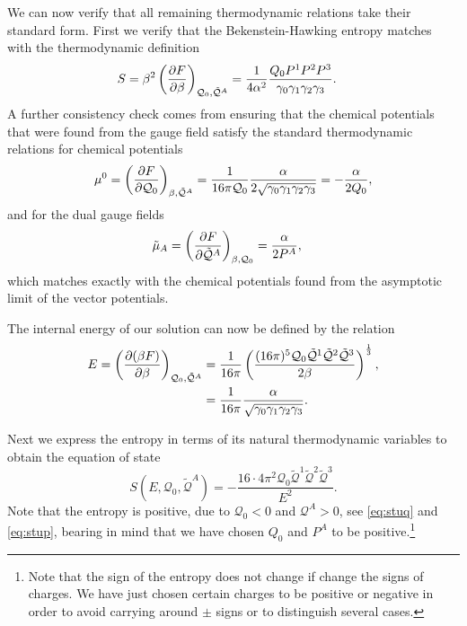 We can now verify that all remaining thermodynamic relations take their standard form.  First we verify that the Bekenstein-Hawking entropy matches with the thermodynamic definition
\begin{equation*}
    \begin{aligned}
        S &= \beta^2 \left(\frac{\partial F}{\partial \beta} \right)_{\mathcal{Q}_0,\tilde{\mathcal{Q}}^A} = \frac{1}{4\alpha^2} \frac{Q_0P^1 P^2 P^3}{\gamma_0 \gamma_1 \gamma_2 \gamma_3}.
    \end{aligned}
\end{equation*}
A further consistency check comes from ensuring that the chemical potentials that were found from the gauge field satisfy the standard thermodynamic relations for chemical potentials
\begin{equation*}
    \mu^0 = \left(\frac{\partial F}{\partial \mathcal{Q}_0} \right)_{\beta,\tilde{\mathcal{Q}}^A}
    = \frac{1}{16 \pi \mathcal{Q}_0} \frac{\alpha}{2 \sqrt{\gamma_0\gamma_1\gamma_2\gamma_3}}
    = -\frac{\alpha}{2 Q_0},
\end{equation*}
and for the dual gauge fields
\begin{equation*}
    \begin{aligned}
        \tilde{\mu}_A &= \left(\frac{\partial F}{\partial \tilde{\mathcal{Q}}^A} \right)_{\beta,\mathcal{Q}_0} = \frac{\alpha}{2 P^A},
    \end{aligned}
\end{equation*}
which matches exactly with the chemical potentials found from the asymptotic limit of the vector potentials.

The internal energy of our solution can now be defined by the relation
\begin{equation}
\label{eq:stumaseaf}
    \begin{aligned}
        E = \left(\frac{\partial (\beta F)}{\partial \beta} \right)_{\mathcal{Q}_0,\tilde{\mathcal{Q}}^A} &= \frac{1}{16\pi}\left(\frac{(16\pi)^5\mathcal{Q}_0 \tilde{\mathcal{Q}}^1
         \tilde{\mathcal{Q}}^2 \tilde{\mathcal{Q}}^3}{2\beta}\right)^{\frac{1}{3}}, \\
        &= \frac{1}{16\pi} \frac{\alpha}{\sqrt{\gamma_0 \gamma_1 \gamma_2 \gamma_3}}.
    \end{aligned}
\end{equation}


Next we express the entropy in terms of its natural thermodynamic variables to obtain the equation of state
\begin{equation*}
    S(E,\mathcal{Q}_0,\tilde{\mathcal{Q}}^A) = -\frac{16\cdot 4\pi^2 \mathcal{Q}_0 \tilde{\mathcal{Q}}^1 \tilde{\mathcal{Q}}^2 \tilde{\mathcal{Q}}^3}{E^2}.
\end{equation*}
Note that the entropy is positive, due to $\mathcal{Q}_0 <0$ and $\mathcal{Q}^A >0$, 
see \eqref{eq:stuq} and \eqref{eq:stup}, bearing in mind that we have chosen $Q_0$ and $P^A$ to be positive.\footnote{Note that the sign of the entropy does not change if change the signs of charges. We have just chosen certain charges to be positive or negative in order to avoid carrying around $\pm$ signs or to distinguish several cases.}

